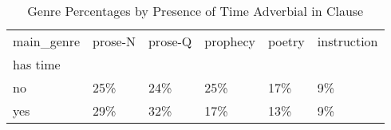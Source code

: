 \begin{table}[htbp!]
\centering
\caption{Genre Percentages by Presence of Time Adverbial in Clause}
\label{table:allcl_genre_pc}
\begin{tabular}{llllll}
\toprule
main\_genre & prose-N & prose-Q & prophecy & poetry & instruction \\
has time &         &         &          &        &             \\
\midrule
no       &     25\% &     24\% &      25\% &    17\% &          9\% \\
yes      &     29\% &     32\% &      17\% &    13\% &          9\% \\
\bottomrule
\end{tabular}
\end{table}
